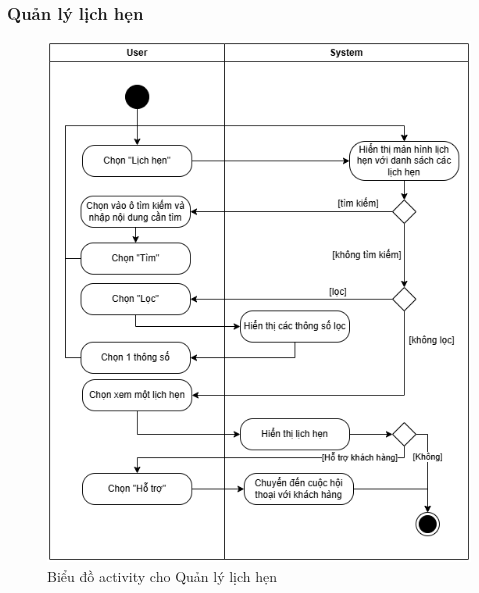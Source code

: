 \subsubsection{Quản lý lịch hẹn}
\begin{figure}[H]
    \centering
    \includegraphics[width=1\textwidth]{Dg_Activity/AppointmentManagement.png}
    \vspace{0.5cm}
    \caption{Biểu đồ activity cho Quản lý lịch hẹn}
    \label{fig:enter-label}
\end{figure}




